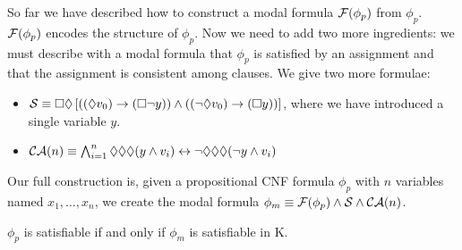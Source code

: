 \documentclass{llncs}
\begin{document}
So far we have described how to construct a modal formula $\mathcal{F}( \phi_p )$ from
$\phi_p$. $\mathcal{F}(\phi_p)$ encodes the structure of $\phi_p$. Now we need to add
two more ingredients: we must describe with a modal formula that $\phi_p$ is
satisfied by an assignment and that the assignment is consistent among clauses.
We give two more formulae:

\begin{itemize}

\item $\mathcal{S} \equiv \Box\Diamond \left[ \left((\Diamond v_0) \to (\Box \neg
y)\right) \land \left( (\neg \Diamond v_0)\to (\Box y) \right) \right]$, where
we have introduced a single variable $y$.

\item $\mathcal{CA}(n) \equiv \bigwedge_{i=1}^n \Diamond\Diamond\Diamond (y \land v_i)
\leftrightarrow \neg \Diamond\Diamond\Diamond (\neg y \land v_i)$

\end{itemize}

Our full construction is, given a propositional CNF formula $\phi_p$ with $n$
variables named $x_1,\ldots,x_n$, we create the modal formula
$\phi_m\equiv\mathcal{F}(\phi_p)\land \mathcal{S}\land \mathcal{CA}(n)$. 


\begin{lemma}

$\phi_p$ is satisfiable if and only if $\phi_m$ is satisfiable in K.

\end{lemma}
\end{document}
